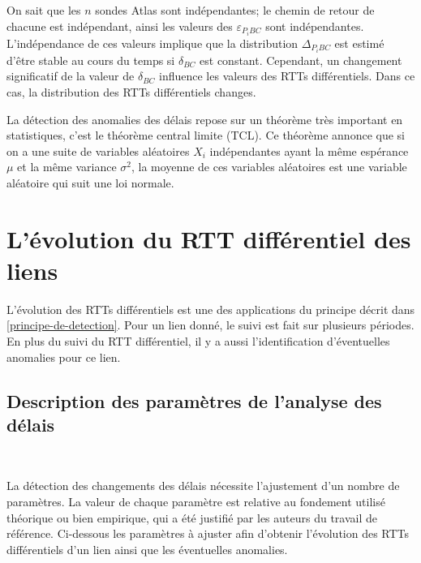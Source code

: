 On sait que les $n$ sondes Atlas sont indépendantes; le chemin de retour de chacune est indépendant, ainsi les valeurs des  $\varepsilon_{P_{i}BC}$ sont  indépendantes. L'indépendance de ces valeurs implique que la distribution $\Delta_{P_{i}BC}$ est estimé d'être stable au cours du temps si $\delta_{BC}$ est constant. Cependant, un changement significatif de la valeur de $\delta_{BC}$ influence les valeurs des RTTs différentiels. Dans ce cas, la distribution des RTTs différentiels changes. 


La détection des anomalies des délais repose sur un théorème très important en statistiques, c'est le théorème  central limite (TCL). Ce théorème  annonce que si on a une suite de variables aléatoires $X_i$ indépendantes ayant la même espérance $\mu$ et la même variance $\sigma^2$, la moyenne de ces variables aléatoires est une variable aléatoire qui suit une loi normale. 




\section{L'évolution du RTT différentiel des liens}

L'évolution des RTTs différentiels est une des applications du principe décrit dans  \ref{principe-de-detection}. Pour un lien donné, le suivi est fait sur plusieurs  périodes. En plus du suivi du RTT différentiel, il y a aussi l'identification d'éventuelles anomalies pour ce lien.

\subsection{Description des paramètres de l'analyse des délais} \label{par:parametre-de-lanalyse}~

La détection des changements des délais nécessite l'ajustement d'un nombre de paramètres. La valeur de chaque paramètre est relative au  fondement utilisé théorique ou bien empirique, qui a été  justifié par les auteurs du travail de référence.   Ci-dessous les paramètres à ajuster afin d'obtenir l'évolution des RTTs différentiels d'un lien ainsi que les éventuelles anomalies.  


